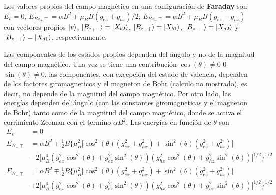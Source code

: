 \documentclass[../main.tex]{subfiles}
\begin{document}
Los valores propios del campo magnético en una configuración de \textbf{Faraday} son $E_v=0$, $E_{Bz_+\mp} = \alpha B^2 \mp \mu_B B(g_{ez}+g_{hz})/2$, $E_{Bz_-\mp} = \alpha B^2 \mp \mu_B B (g_{ez} - g_{hz})$ con vectores propios $\ket{v}$, $\ket{B_{z_+-}} = \ket{X_{b2}}$, $\ket{B_{z_++}} = \ket{X_{b1}}$, $\ket{B_{z_--}} = \ket{X_{d2}}$ y $\ket{B_{z_-+}} = \ket{X_{d1}}$, respectivamente.

Las componentes de los estados propios dependen del ángulo y no de la magnitud del campo magnético. Una vez se tiene una contribución $\cos(\theta)\neq 0$ 0 $\sin(\theta)\neq 0$, las componentes, con excepción del estado de valencia, dependen de los factores giromagneticos y el magneton de Bohr (calculo no mostrado), es decir, no depende de la magnitud del campo magnético. Por otro lado, las energías dependen del ángulo (con las constantes giromagneticas y el magneton de Bohr) tanto como de la  magnitud del campo magnético, donde se activa el corrimiento Zeeman con el termino $\alpha B^2$. Las energías en función de $\theta$ son
\begin{align*}
    E_v &= 0\\
    E_{B_-\mp} &= \alpha B^2 \mp \tfrac{1}{2} B \big\{\mu_B^2 \big[\cos ^2(\theta ) \left(g_{ex}^2+g_{hx}^2\right)+\sin ^2(\theta ) \left(g_{ez}^2+g_{hz}^2\right) \big] \\
    &- 2 \big[\mu_B^4 \left(g_{ex}^2 \cos ^2(\theta )+g_{ez}^2 \sin ^2(\theta )\right) \left(g_{hx}^2 \cos ^2(\theta )+g_{hz}^2 \sin ^2(\theta )\right) \big]^{1/2} \big \}^{1/2}\\
    E_{B_+\mp} &= \alpha B^2 \mp \tfrac{1}{2} B \big\{\mu_B^2 \big[\cos ^2(\theta ) \left(g_{ex}^2+g_{hx}^2\right)+\sin ^2(\theta ) \left(g_{ez}^2+g_{hz}^2\right) \big] \\
    &+ 2 \big[\mu_B^4 \left(g_{ex}^2 \cos ^2(\theta )+g_{ez}^2 \sin ^2(\theta )\right) \left(g_{hx}^2 \cos ^2(\theta )+g_{hz}^2 \sin ^2(\theta )\right) \big]^{1/2} \big \}^{1/2}
\end{align*}
\end{document}
